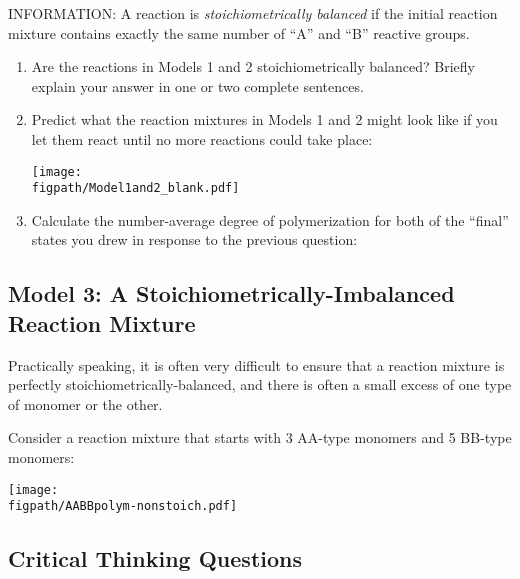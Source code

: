 	INFORMATION: A reaction is \emph{stoichiometrically balanced} if the initial reaction mixture contains exactly the same number of ``A'' and ``B'' reactive groups.
	
	\begin{enumerate}[resume]
		\item Are the reactions in Models 1 and 2 stoichiometrically balanced?  Briefly explain your answer in one or two complete sentences.
		
		\vspace{1in}
		
		\item Predict what the reaction mixtures in Models 1 and 2 might look like if you let them react until no more reactions could take place:
		
\vspace{0.1in}
\centerline{\texttt{[image: \\figpath/Model1and2\_blank.pdf]}}
		
		\item Calculate the number-average degree of polymerization for both of the ``final'' states you drew in response to the previous question:
		
		\vspace{1in}
	\end{enumerate}

\subsection{Model 3: A Stoichiometrically-Imbalanced Reaction Mixture}

Practically speaking, it is often very difficult to ensure that a reaction mixture is perfectly stoichiometrically-balanced, and there is often a small excess of one type of monomer or the other.

Consider a reaction mixture that starts with 3 AA-type monomers and 5 BB-type monomers:

\vspace{0.1in}
\centerline{\texttt{[image: \\figpath/AABBpolym-nonstoich.pdf]}}

\subsection*{Critical Thinking Questions}

